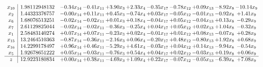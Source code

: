 \documentclass[9pt]{article}
\begin{document}
\[\begin{array}{c| c c@{\hskip 2pt} c@{\hskip 2pt} c@{\hskip 2pt} c@{\hskip 2pt} c@{\hskip 2pt} c@{\hskip 2pt} c@{\hskip 2pt} c@{\hskip 2pt} c@{\hskip 2pt} }
 x_{10}   &  1.98112948132 & -0.34 x_{14} & -0.41 x_{11} & +  3.90 x_{3} & +  2.33 x_{4} & -0.35 x_{17} & -0.78 x_{12} & +  0.09 x_{13} & -8.92 x_{8} & -10.14 x_{9}\\
 x_{2}   &  1.44323376757 & -0.00 x_{14} & +  0.11 x_{11} & +  0.45 x_{3} & -0.74 x_{4} & +  0.03 x_{17} & -0.05 x_{12} & -0.01 x_{13} & -0.92 x_{8} & +  1.41 x_{9}\\
 x_{6}   &  1.68076513251 & -0.02 x_{14} & -0.02 x_{11} & +  0.01 x_{3} & +  0.18 x_{4} & -0.04 x_{17} & +  0.05 x_{12} & -0.04 x_{13} & +  0.13 x_{8} & -0.29 x_{9}\\
 x_{7}   &  2.61129825044 & -0.02 x_{14} & -0.02 x_{11} & -0.36 x_{3} & -0.25 x_{4} & +  0.04 x_{17} & +  0.05 x_{12} & +  0.02 x_{13} & +  1.04 x_{8} & -0.32 x_{9}\\
 x_{1}   &  2.58483140274 & +  0.07 x_{14} & +  0.07 x_{11} & -0.23 x_{3} & +  0.02 x_{4} & -0.01 x_{17} & +  0.01 x_{12} & +  0.08 x_{13} & -0.07 x_{8} & +  0.28 x_{9}\\
 x_{15}   &  13.2464510363 & -0.87 x_{14} & -0.36 x_{11} & -2.16 x_{3} & +  0.06 x_{4} & -0.20 x_{17} & +  0.48 x_{12} & -0.80 x_{13} & +  1.92 x_{8} & +  0.68 x_{9}\\
 x_{16}   &  14.2299178497 & +  0.96 x_{14} & +  0.46 x_{11} & -5.29 x_{3} & +  4.61 x_{4} & -0.03 x_{17} & +  0.04 x_{12} & +  0.14 x_{13} & -9.94 x_{8} & -0.54 x_{9}\\
 x_{5}   &  1.92678651222 & +  0.05 x_{14} & -0.03 x_{11} & -0.76 x_{3} & +  0.54 x_{4} & +  0.04 x_{17} & +  0.02 x_{12} & -0.03 x_{13} & +  0.19 x_{8} & +  0.06 x_{9}\\
\hline
z    &  12.9223180834 & +  0.00 x_{14} & +  0.38 x_{11} & -4.69 x_{3} & +  1.09 x_{4} & +  0.22 x_{17} & -0.07 x_{12} & -0.05 x_{13} & -6.39 x_{8} & +  7.08 x_{9}\\
\end{array}\]
\end{document}
